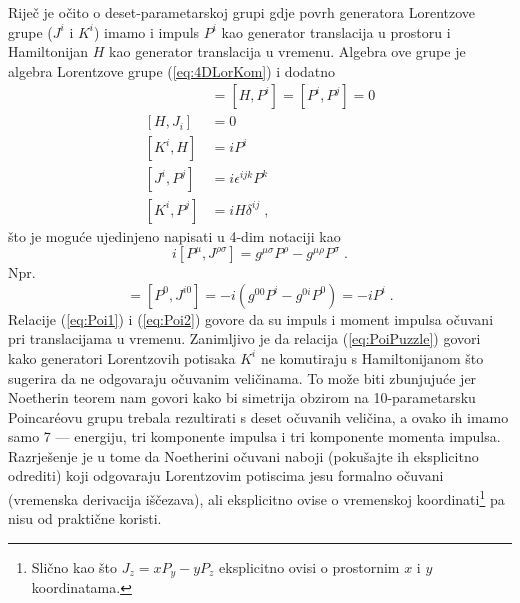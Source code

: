 Riječ je očito o deset-parametarskoj grupi gdje povrh generatora
Lorentzove grupe ($J^i$ i $K^i$) imamo i impuls $P^i$ kao
generator translacija u prostoru i Hamiltonijan $H$ kao
generator translacija u vremenu.
Algebra ove grupe je algebra Lorentzove grupe  (\ref{eq:4DLorKom}) 
i dodatno
\begin{align}
[H, H]& = [H, P^i] = [P^i, P^j] = 0 \label{eq:Poi1} \\
[H, J_i]& = 0  \label{eq:Poi2}\\
[K^i, H]& = i P^i  \label{eq:PoiPuzzle} \\
[J^i, P^j]& = i \epsilon^{ijk} P^k \\
[K^i, P^j]& = i H \delta^{ij} \;,
\label{eq:PoinKom}
\end{align}
što je moguće ujedinjeno napisati u 4-dim notaciji kao
\begin{equation}
i [P^\mu, J^{\rho\sigma}] = g^{\mu\sigma}P^\rho - g^{\mu\rho}P^{\sigma} \;.
\label{eq:4DPoinKom}
\end{equation}
Npr.
\begin{displaymath}
[H, K^i] = [P^0, J^{i0}] = -i(g^{0 0}P^i - g^{0i}P^0) =  -i P^i \;.
\end{displaymath}
Relacije  (\ref{eq:Poi1}) i (\ref{eq:Poi2}) govore da su impuls i
moment impulsa očuvani pri translacijama u vremenu. Zanimljivo je da relacija
(\ref{eq:PoiPuzzle}) govori kako generatori Lorentzovih potisaka
$K^i$ ne komutiraju s Hamiltonijanom što sugerira da ne odgovaraju
očuvanim veličinama. To može biti zbunjujuće jer Noetherin teorem
nam govori kako bi simetrija obzirom na 10-parametarsku Poincar\'{e}ovu grupu
trebala rezultirati s deset očuvanih veličina, a ovako ih imamo samo
7 --- energiju, tri komponente impulsa i tri komponente momenta impulsa.
Razrješenje je u tome da Noetherini očuvani naboji
(pokušajte ih eksplicitno odrediti) koji
odgovaraju Lorentzovim potiscima jesu formalno očuvani (vremenska
derivacija iščezava), ali eksplicitno ovise o vremenskoj 
koordinati\footnote{Slično kao što $J_z = x P_y - y P_z$ 
eksplicitno ovisi o prostornim $x$ i $y$ koordinatama.}
pa nisu od praktične koristi. 


